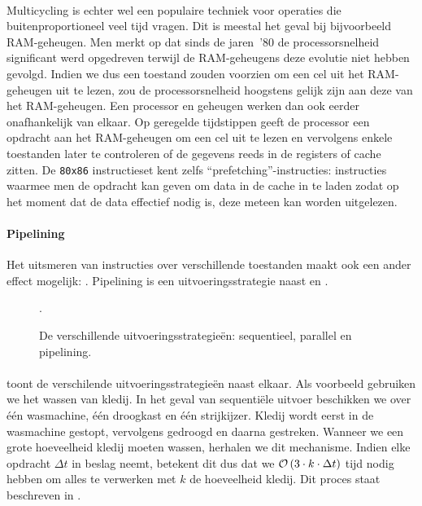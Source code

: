 \paragraph{}
Multicycling is echter wel een populaire techniek voor operaties die buitenproportioneel veel tijd vragen. Dit is meestal het geval bij bijvoorbeeld RAM-geheugen. Men merkt op dat sinds de jaren~'80 de processorsnelheid significant werd opgedreven terwijl de RAM-geheugens deze evolutie niet hebben gevolgd. Indien we dus een toestand zouden voorzien om een cel uit het RAM-geheugen uit te lezen, zou de processorsnelheid hoogstens gelijk zijn aan deze van het RAM-geheugen. Een processor en geheugen werken dan ook eerder onafhankelijk van elkaar. Op geregelde tijdstippen geeft de processor een opdracht aan het RAM-geheugen om een cel uit te lezen en vervolgens enkele toestanden later te controleren of de gegevens reeds in de registers of cache zitten. De \verb+80x86+ instructieset kent zelfs ``prefetching''-instructies: instructies waarmee men de opdracht kan geven om data in de cache in te laden zodat op het moment dat de data effectief nodig is, deze meteen kan worden uitgelezen.
\paragraph{Pipelining}
Het uitsmeren van instructies over verschillende toestanden maakt ook een ander effect mogelijk: . Pipelining is een uitvoeringsstrategie naast  en .
\begin{figure}[hbt]
\centering
{}
\caption{De verschillende uitvoeringsstrategie\"en: sequentieel, parallel en pipelining.}
.
\end{figure}
\paragraph{}
 toont de verschilende uitvoeringsstrategie\"en naast elkaar. Als voorbeeld gebruiken we het wassen van kledij. In het geval van sequenti\"ele uitvoer beschikken we over \'e\'en wasmachine, \'e\'en droogkast en \'e\'en strijkijzer. Kledij wordt eerst in de wasmachine gestopt, vervolgens gedroogd en daarna gestreken. Wanneer we een grote hoeveelheid kledij moeten wassen, herhalen we dit mechanisme. Indien elke opdracht $\Delta t$ in beslag neemt, betekent dit dus dat we $\mathcal{O}\left( 3\cdot k\cdot\Delta t \right)$ tijd nodig hebben om alles te verwerken met $k$ de hoeveelheid kledij. Dit proces staat beschreven in .

